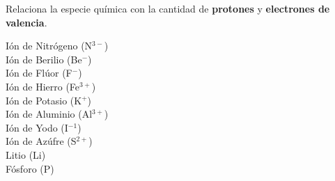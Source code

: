 \question[10] Relaciona la especie química con la cantidad de \textbf{protones} y \textbf{electrones de valencia}.

\begin{multicols}{2}
    \begin{choices}
        \choice Ión de Nitrógeno (N$^{3-}$) \\  
        \choice Ión de Berilio (Be$^{-}$) \\  
        \choice Ión de Flúor   (F$^-$) \\  
        \choice Ión de Hierro (Fe$^{3+}$)  \\  
        \choice Ión de Potasio (K$^+$) \\ 
        \columnbreak
        \choice Ión de Aluminio  (Al$^{3+}$) \\ 
        \choice Ión de Yodo (I$^{-1}$) \\ 
        \choice Ión de Azúfre (S$^{2+}$) \\ 
        \choice Litio (Li) \\ 
        \choice Fósforo (P)    \\  
    \end{choices}
\end{multicols}
